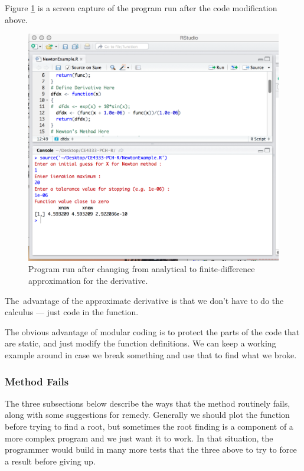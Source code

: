 Figure \ref{fig:NewtonTrials2} is a screen capture of the program run after the code modification above.   
\begin{figure}[h!] %
   \centering
   \includegraphics[width=6in]{./3-Differentation/NewtonTrials2.jpg} 
   \caption{Program run after changing from analytical to finite-difference approximation for the derivative.}
   \label{fig:NewtonTrials2}
\end{figure}

The~advantage of the approximate derivative is that we don't have to do the calculus --- just code in the function.  

The obvious advantage of modular coding is to protect the parts of the code that are static, and just modify the function definitions.   We can keep a working example around in case we break something and use that to find what we broke.

\subsubsection{Method Fails}
The three subsections below describe the ways that the method routinely fails, along with some suggestions for remedy.   Generally we should plot the function before trying to find a root, but sometimes the root finding is a component of a more complex program and we just want it to work.   In that situation, the programmer would build in many more tests that the three above to try to force a result before giving up.   

